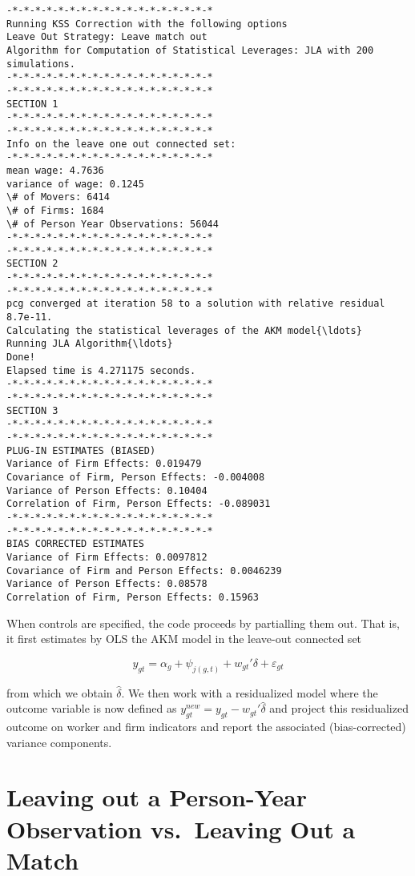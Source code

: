 \documentclass[11pt]{article}
\begin{document}
    \begin{Verbatim}[commandchars=\\\{\}]
-*-*-*-*-*-*-*-*-*-*-*-*-*-*-*-*-*-*
Running KSS Correction with the following options
Leave Out Strategy: Leave match out
Algorithm for Computation of Statistical Leverages: JLA with 200 simulations.
-*-*-*-*-*-*-*-*-*-*-*-*-*-*-*-*-*-*
-*-*-*-*-*-*-*-*-*-*-*-*-*-*-*-*-*-*
SECTION 1
-*-*-*-*-*-*-*-*-*-*-*-*-*-*-*-*-*-*
-*-*-*-*-*-*-*-*-*-*-*-*-*-*-*-*-*-*
Info on the leave one out connected set:
-*-*-*-*-*-*-*-*-*-*-*-*-*-*-*-*-*-*
mean wage: 4.7636
variance of wage: 0.1245
\# of Movers: 6414
\# of Firms: 1684
\# of Person Year Observations: 56044
-*-*-*-*-*-*-*-*-*-*-*-*-*-*-*-*-*-*
-*-*-*-*-*-*-*-*-*-*-*-*-*-*-*-*-*-*
SECTION 2
-*-*-*-*-*-*-*-*-*-*-*-*-*-*-*-*-*-*
-*-*-*-*-*-*-*-*-*-*-*-*-*-*-*-*-*-*
pcg converged at iteration 58 to a solution with relative residual 8.7e-11.
Calculating the statistical leverages of the AKM model{\ldots}
Running JLA Algorithm{\ldots}
Done!
Elapsed time is 4.271175 seconds.
-*-*-*-*-*-*-*-*-*-*-*-*-*-*-*-*-*-*
-*-*-*-*-*-*-*-*-*-*-*-*-*-*-*-*-*-*
SECTION 3
-*-*-*-*-*-*-*-*-*-*-*-*-*-*-*-*-*-*
-*-*-*-*-*-*-*-*-*-*-*-*-*-*-*-*-*-*
PLUG-IN ESTIMATES (BIASED)
Variance of Firm Effects: 0.019479
Covariance of Firm, Person Effects: -0.004008
Variance of Person Effects: 0.10404
Correlation of Firm, Person Effects: -0.089031
-*-*-*-*-*-*-*-*-*-*-*-*-*-*-*-*-*-*
-*-*-*-*-*-*-*-*-*-*-*-*-*-*-*-*-*-*
BIAS CORRECTED ESTIMATES
Variance of Firm Effects: 0.0097812
Covariance of Firm and Person Effects: 0.0046239
Variance of Person Effects: 0.08578
Correlation of Firm, Person Effects: 0.15963
    \end{Verbatim}

    When controls are specified, the code proceeds by partialling them out.
That is, it first estimates by OLS the AKM model in the leave-out connected set

\begin{equation}
y_{gt}=\alpha_{g}+\psi_{j(g,t)}+w_{gt}'\delta+\varepsilon_{gt}
\end{equation}

from which we obtain \(\hat{\delta}\). We then work with a residualized
model where the outcome variable is now defined as
\(y_{gt}^{new}=y_{gt}-w_{gt}'\hat{\delta}\) and project this
residualized outcome on worker and firm indicators and report the
associated (bias-corrected) variance components.

    \hypertarget{leaving-out-a-person-year-observation-vs.-leaving-out-a-match}{%
\section{Leaving out a Person-Year Observation vs.~Leaving Out a
Match}\label{leaving-out-a-person-year-observation-vs.-leaving-out-a-match}}
\end{document}

